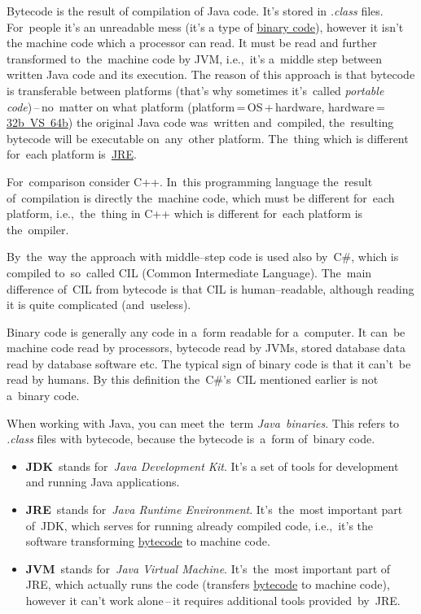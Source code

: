 
\label{bytecode}
Bytecode is the result of compilation of Java code. It's stored in \textit{.class} files. For~people it's an unreadable mess (it's a type of \hyperref[bytecodebinarycode]{binary code}), however it isn't the machine code which a processor can read. It must be read and further transformed to~the~machine code by JVM, i.e.,~it's a~middle step between written Java code and its execution. The reason of this approach is that bytecode is transferable between platforms (that's why sometimes it's~called \textit{portable code})\,--\,no~matter on what platform (platform\,=\,OS\,+\,hardware, hardware\,=\,\hyperref[32bvs64b]{32b~VS~64b}) the original Java code was~written and~compiled, the~resulting bytecode will be executable on~any~other platform. The~thing which is different for~each platform is~\hyperref[jdkjrejvm]{JRE}.

For~comparison consider C++. In~this programming language the~result of~compilation is directly the~machine code, which must be different for~each platform, i.e.,~the~thing in C++ which is different for~each platform is the~ompiler.

By~the~way the approach with middle--step code is used also by~C\#, which is compiled to~so~called CIL (Common Intermediate Language). The~main difference of~CIL from bytecode is that CIL is human--readable, although reading it is quite complicated (and~useless).

\label{bytecodebinarycode}
Binary code is generally any code in a~form readable for a~computer. It can~be machine code read by processors, bytecode read by JVMs, stored database data read by database software etc. The typical sign of binary code is that it can't~be read by humans. By this definition the~C\#'s~CIL mentioned earlier is not a~binary code.

When working with Java, you can meet the~term \textit{Java~binaries}. This refers to \textit{.class} files with bytecode, because the bytecode is~a~form of~binary code.
\newpage

\label{jdkjrejvm}
\begin{itemize}
    \item \textbf{JDK}~stands for~\textit{Java Development Kit}. It's a set of tools for development and running Java applications.
    \item \textbf{JRE}~stands for~\textit{Java Runtime Environment}. It's~the~most important part of~JDK, which serves for running already compiled code, i.e.,~it's the software transforming \hyperref[bytecode]{bytecode} to machine code.
    \item \textbf{JVM}~stands for~\textit{Java Virtual Machine}. It's~the~most important part of JRE, which actually runs the code (transfers \hyperref[bytecode]{bytecode} to machine code), however it can't work alone\,--\,it requires additional tools provided~by~JRE.
\end{itemize}

